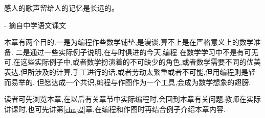 \documentclass[main.tex]{subfiles}
\begin{document}
\begin{flushright}
	\begin{kaishu}
		感人的歌声留给人的记忆是长远的。\\
	\end{kaishu}
	- 摘自中学语文课文
\end{flushright}

本章有两个目的.一是为编程作些数学铺垫,是漫谈,算不上是在严格意义上的数学准备.
二是通过一些实际例子说明,在与时俱进的今天,编程
在数学学习中不是有可无可.在这些实际例子中,或者数学扮演着的不可缺少的角色,或者数学需要不同的优美表达.但所涉及的计算,手工进行的话,或者劳动太繁重或者不可能,但用编程则是轻而易举的.
但愿达成一个共识,编程与作图作为一个工具,会成为数学想象的翅膀.

读者可先浏览本章,在以后有关章节中实际编程时,会回到本章有关问题.教师在实际讲课时,也可先讲第\ref{chap2}章,在编程和作图时再结合例子介绍本章内容.
\end{document}
